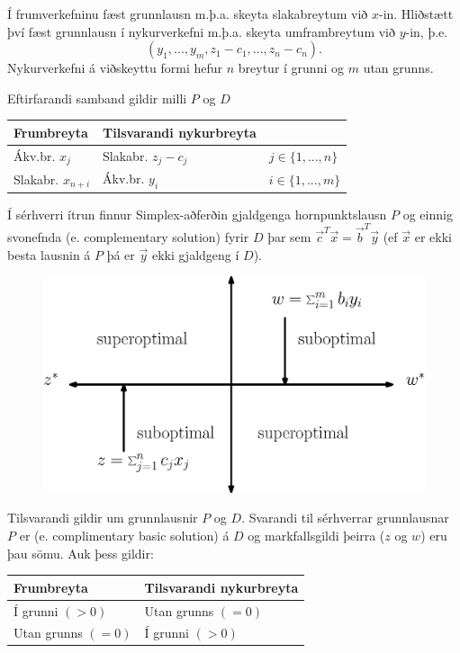 Í frumverkefninu fæst grunnlausn m.þ.a. skeyta slakabreytum við $x$-in. Hliðstætt því fæst grunnlausn í nykurverkefni m.þ.a. skeyta umframbreytum við $y$-in, þ.e. $$ (y_1,...,y_m,z_1-c_1,...,z_n-c_n).$$ Nykurverkefni á viðskeyttu formi hefur $n$ breytur í grunni og $m$ utan grunns.

\begin{samepage}
Eftirfarandi samband gildir milli $P$ og $D$
\begin{center}
 \begin{tabular}{lll}
  Frumbreyta 		&	Tilsvarandi nykurbreyta \\ \hline 
  Ákv.br. $x_j$		&	Slakabr. $z_j-c_j$	& $j\in\{1,...,n\}$ \\
  Slakabr. $x_{n+i}$	&	Ákv.br. $y_i$		& $i\in\{1,...,m\}$
 \end{tabular}
\end{center}
Í sérhverri ítrun finnur Simplex-aðferðin gjaldgenga hornpunktslausn $P$ og einnig svonefnda  (e. complementary solution) fyrir $D$ þar sem $\vec{c}^T\vec{x}=\vec{b}^T\vec{y}$ (ef $\vec{x}$ er ekki besta lausnin á $P$ þá er $\vec{y}$ ekki gjaldgeng í $D$).
\end{samepage}

\begin{figure}[t!]
\centering
\includegraphics[width=0.7\columnwidth]{figs/complementary.eps}
\end{figure}

Tilsvarandi gildir um grunnlausnir $P$ og $D$. Svarandi til sérhverrar grunn\-lausnar $P$ er  (e. complimentary basic solution) á $D$ og markfallsgildi þeirra ($z$ og $w$) eru þau sömu. Auk þess gildir:
\begin{center}
 \begin{tabular}{ll}
  Frumbreyta 		&	Tilsvarandi nykurbreyta \\ \hline 
  Í grunni $(>0)$	&	Utan grunns $(=0)$	\\
  Utan grunns $(=0)$	&	Í grunni $(>0)$		
 \end{tabular}
\end{center}

